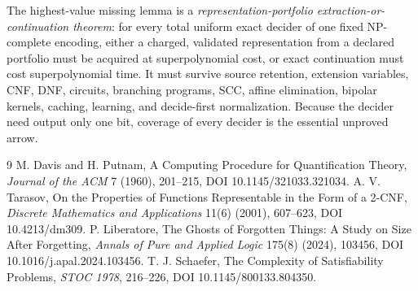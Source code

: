 \documentclass[11pt]{article}
\begin{document}
The highest-value missing lemma is a \emph{representation-portfolio extraction-or-continuation theorem}: for every total uniform exact decider of one fixed NP-complete encoding, either a charged, validated representation from a declared portfolio must be acquired at superpolynomial cost, or exact continuation must cost superpolynomial time. It must survive source retention, extension variables, CNF, DNF, circuits, branching programs, SCC, affine elimination, bipolar kernels, caching, learning, and decide-first normalization. Because the decider need output only one bit, coverage of every decider is the essential unproved arrow.

\begin{thebibliography}{9}
 M. Davis and H. Putnam, A Computing Procedure for Quantification Theory, \emph{Journal of the ACM} 7 (1960), 201--215, DOI 10.1145/321033.321034.
 A. V. Tarasov, On the Properties of Functions Representable in the Form of a 2-CNF, \emph{Discrete Mathematics and Applications} 11(6) (2001), 607--623, DOI 10.4213/dm309.
 P. Liberatore, The Ghosts of Forgotten Things: A Study on Size After Forgetting, \emph{Annals of Pure and Applied Logic} 175(8) (2024), 103456, DOI 10.1016/j.apal.2024.103456.
 T. J. Schaefer, The Complexity of Satisfiability Problems, \emph{STOC 1978}, 216--226, DOI 10.1145/800133.804350.
\end{thebibliography}
\end{document}
